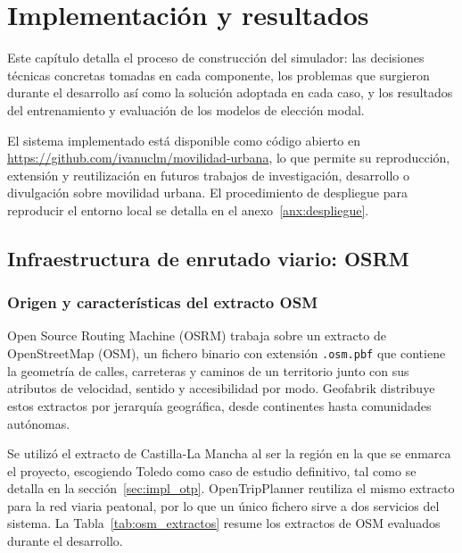 \chapter{Implementación y resultados}
\label{ch:implementacion}

Este capítulo detalla el proceso de construcción del simulador: las decisiones técnicas concretas tomadas en cada componente, los problemas que surgieron durante el desarrollo así como la solución adoptada en cada caso, y los resultados del entrenamiento y evaluación de los modelos de elección modal.

El sistema implementado está disponible como código abierto en \url{https://github.com/ivanuclm/movilidad-urbana}, lo que permite su reproducción, extensión y reutilización en futuros trabajos de investigación, desarrollo o divulgación sobre movilidad urbana. El procedimiento de despliegue para reproducir el entorno local se detalla en el anexo~\ref{anx:despliegue}.


\section{Infraestructura de enrutado viario: OSRM}
\label{sec:impl_osrm}

\subsection{Origen y características del extracto OSM}
\label{subsec:impl_osrm_origen}

Open Source Routing Machine (OSRM) trabaja sobre un extracto de OpenStreetMap (OSM), un fichero binario con extensión \texttt{.osm.pbf} que contiene la geometría de calles, carreteras y caminos de un territorio junto con sus atributos de velocidad, sentido y accesibilidad por modo. Geofabrik \cite{GeofabrikDownloads} distribuye estos extractos por jerarquía geográfica, desde continentes hasta comunidades autónomas.

Se utilizó el extracto de Castilla-La Mancha al ser la región en la que se enmarca el proyecto, escogiendo Toledo como caso de estudio definitivo, tal como se detalla en la sección~\ref{sec:impl_otp}. OpenTripPlanner reutiliza el mismo extracto para la red viaria peatonal, por lo que un único fichero sirve a dos servicios del sistema. La Tabla~\ref{tab:osm_extractos} resume los extractos de OSM evaluados durante el desarrollo.

